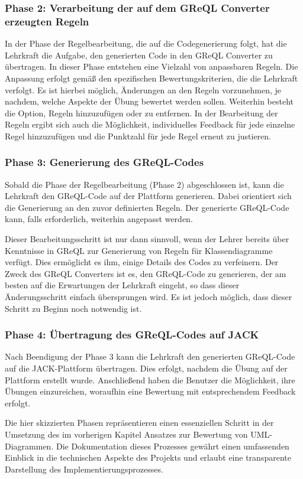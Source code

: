 \subsubsection{Phase 2: Verarbeitung der auf dem GReQL Converter erzeugten Regeln}

In der Phase der Regelbearbeitung, die auf die Codegenerierung folgt, hat die Lehrkraft die Aufgabe, den generierten
Code in den GReQL Converter zu übertragen. In dieser Phase entstehen eine Vielzahl von anpassbaren Regeln. Die Anpassung
erfolgt gemäß den spezifischen Bewertungskriterien, die die Lehrkraft verfolgt. Es ist hierbei möglich, Änderungen an
den Regeln vorzunehmen, je nachdem, welche Aspekte der Übung bewertet werden sollen. Weiterhin besteht die Option,
Regeln hinzuzufügen oder zu entfernen. In der Bearbeitung der Regeln ergibt sich auch die Möglichkeit, individuelles
Feedback für jede einzelne Regel hinzuzufügen und die Punktzahl für jede Regel erneut zu justieren.


\subsubsection{Phase 3: Generierung des GReQL-Codes}

Sobald die Phase der Regelbearbeitung (Phase 2) abgeschlossen ist, kann die Lehrkraft den GReQL-Code auf der Plattform
generieren. Dabei orientiert sich die Generierung an den zuvor definierten Regeln. Der generierte GReQL-Code kann,
falls erforderlich, weiterhin angepasst werden.

Dieser Bearbeitungsschritt ist nur dann sinnvoll, wenn der Lehrer bereits über Kenntnisse in GReQL zur Generierung von
Regeln für Klassendiagramme verfügt. Dies ermöglicht es ihm, einige Details des Codes zu verfeinern. Der Zweck des
GReQL Converters ist es, den GReQL-Code zu generieren, der am besten auf die Erwartungen der Lehrkraft eingeht, so dass
dieser Änderungsschritt einfach übersprungen wird. Es ist jedoch möglich, dass dieser Schritt zu Beginn noch notwendig
ist.

\subsubsection{Phase 4: Übertragung des GReQL-Codes auf JACK}

Nach Beendigung der Phase 3 kann die Lehrkraft den generierten GReQL-Code auf die JACK-Plattform übertragen. Dies
erfolgt, nachdem die Übung auf der Plattform erstellt wurde. Anschließend haben die Benutzer die Möglichkeit, ihre
Übungen einzureichen, woraufhin eine Bewertung mit entsprechendem Feedback erfolgt.


Die hier skizzierten Phasen repräsentieren einen essenziellen Schritt in der Umsetzung des im vorherigen Kapitel Ansatzes
zur Bewertung von UML-Diagrammen. Die Dokumentation dieses Prozesses gewährt einen
umfassenden Einblick in die technischen Aspekte des Projekts und erlaubt eine transparente Darstellung des
Implementierungsprozesses.



